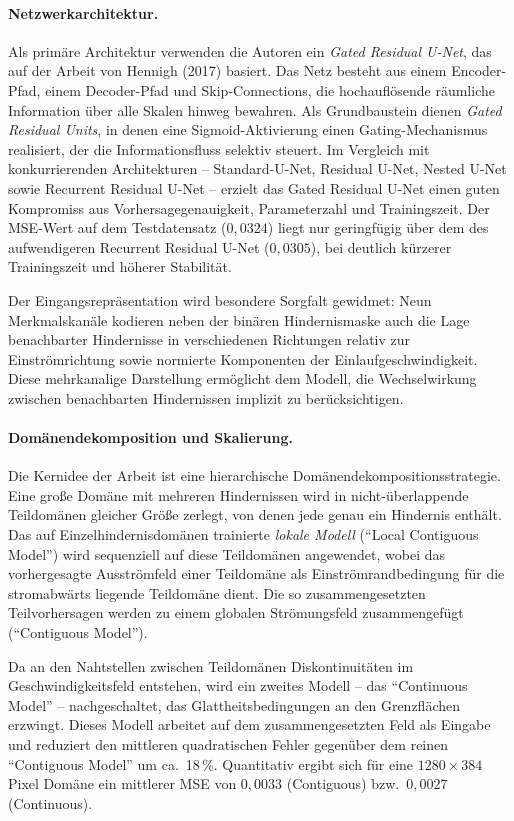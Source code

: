 \documentclass[a4paper,12pt]{article}
\begin{document}
\paragraph{Netzwerkarchitektur.}
Als primäre Architektur verwenden die Autoren ein \emph{Gated Residual U-Net}, das auf der Arbeit
von Hennigh (2017) basiert. Das Netz besteht aus einem Encoder-Pfad, einem Decoder-Pfad und
Skip-Connections, die hochauflösende räumliche Information über alle Skalen hinweg bewahren.
Als Grundbaustein dienen \emph{Gated Residual Units}, in denen eine Sigmoid-Aktivierung einen
Gating-Mechanismus realisiert, der die Informationsfluss selektiv steuert. Im Vergleich mit
konkurrierenden Architekturen -- Standard-U-Net, Residual U-Net, Nested U-Net sowie Recurrent
Residual U-Net -- erzielt das Gated Residual U-Net einen guten Kompromiss aus Vorhersagegenauigkeit,
Parameterzahl und Trainingszeit. Der MSE-Wert auf dem Testdatensatz ($0{,}0324$) liegt nur
geringfügig über dem des aufwendigeren Recurrent Residual U-Net ($0{,}0305$), bei deutlich
kürzerer Trainingszeit und höherer Stabilität.

Der Eingangsrepräsentation wird besondere Sorgfalt gewidmet: Neun Merkmalskanäle kodieren
neben der binären Hindernismaske auch die Lage benachbarter Hindernisse in verschiedenen
Richtungen relativ zur Einströmrichtung sowie normierte Komponenten der Einlaufgeschwindigkeit.
Diese mehrkanalige Darstellung ermöglicht dem Modell, die Wechselwirkung zwischen benachbarten
Hindernissen implizit zu berücksichtigen.

\paragraph{Domänendekomposition und Skalierung.}
Die Kernidee der Arbeit ist eine hierarchische Domänendekompositionsstrategie. Eine große Domäne
mit mehreren Hindernissen wird in nicht-überlappende Teildomänen gleicher Größe zerlegt,
von denen jede genau ein Hindernis enthält. Das auf Einzelhindernisdomänen trainierte
\emph{lokale Modell} (``Local Contiguous Model'') wird sequenziell auf diese Teildomänen
angewendet, wobei das vorhergesagte Ausströmfeld einer Teildomäne als Einströmrandbedingung
für die stromabwärts liegende Teildomäne dient. Die so zusammengesetzten Teilvorhersagen
werden zu einem globalen Strömungsfeld zusammengefügt (``Contiguous Model'').

Da an den Nahtstellen zwischen Teildomänen Diskontinuitäten im Geschwindigkeitsfeld
entstehen, wird ein zweites Modell -- das ``Continuous Model'' -- nachgeschaltet, das
Glattheitsbedingungen an den Grenzflächen erzwingt. Dieses Modell arbeitet auf dem
zusammengesetzten Feld als Eingabe und reduziert den mittleren quadratischen Fehler
gegenüber dem reinen ``Contiguous Model'' um ca.\ 18\,\%. Quantitativ ergibt sich für
eine $1280 \times 384$ Pixel Domäne ein mittlerer MSE von $0{,}0033$ (Contiguous) bzw.\
$0{,}0027$ (Continuous).
\end{document}
